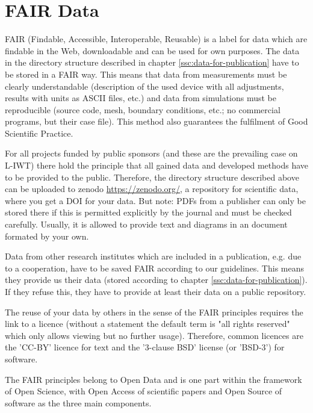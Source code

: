 \section{FAIR Data}

FAIR (Findable, Accessible, Interoperable, Reusable) is a label for data which are findable in the Web, downloadable and can be used for own purposes. The data in the directory structure described in chapter \ref{ssc:data-for-publication} have to be stored in a FAIR way. This means that data from measurements must be clearly understandable (description of the used device with all adjustments, results with units as ASCII files, etc.) and data from simulations must be reproducible (source code, mesh, boundary conditions, etc.; no commercial programs, but their case file). This method also guarantees the fulfilment of Good Scientific Practice.

For all projects funded by public sponsors (and these are the prevailing case on L-IWT) there hold the principle that all gained data and developed methods have to be provided to the public. Therefore, the directory structure described above can be uploaded to zenodo \url{https://zenodo.org/}, a repository for scientific data, where you get a DOI for your data. But note: PDFs from a publisher can only be stored there if this is permitted explicitly by the journal and must be checked carefully. Usually, it is allowed to provide text and diagrams in an document formated by your own.

Data from other research institutes which are included in a publication, e.g. due to a cooperation, have to be saved FAIR according to our guidelines. This means they provide us their data (stored according to chapter  \ref{ssc:data-for-publication}). If they refuse this, they have to provide at least their data on a public repository.

The reuse of your data by others in the sense of the FAIR principles requires the link to a licence (without a statement the default term is "all rights reserved" which only allows viewing but no further usage).
Therefore, common licences are the 'CC-BY' licence for text and  the '3-clause BSD' license (or 'BSD-3') for software.

The FAIR principles belong to Open Data and is one part within the framework of Open Science, with Open Access of scientific papers and Open Source of software as the three main components.
